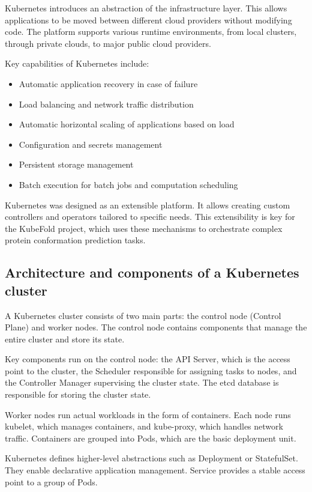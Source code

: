 Kubernetes introduces an abstraction of the infrastructure layer.
This allows applications to be moved between different cloud providers without modifying code.
The platform supports various runtime environments, from local clusters, through private clouds, to major public cloud providers.

Key capabilities of Kubernetes include:
\begin{itemize}
    \item Automatic application recovery in case of failure
    \item Load balancing and network traffic distribution
    \item Automatic horizontal scaling of applications based on load
    \item Configuration and secrets management
    \item Persistent storage management
    \item Batch execution for batch jobs and computation scheduling
\end{itemize}

Kubernetes was designed as an extensible platform.
It allows creating custom controllers and operators tailored to specific needs.
This extensibility is key for the KubeFold project, which uses these mechanisms to orchestrate complex protein conformation prediction tasks.

\subsection{Architecture and components of a Kubernetes cluster}

A Kubernetes cluster consists of two main parts: the control node (Control Plane) and worker nodes.
The control node contains components that manage the entire cluster and store its state.

Key components run on the control node: the API Server, which is the access point to the cluster, the Scheduler responsible for assigning tasks to nodes, and the Controller Manager supervising the cluster state.
The etcd database is responsible for storing the cluster state.

Worker nodes run actual workloads in the form of containers.
Each node runs kubelet, which manages containers, and kube-proxy, which handles network traffic.
Containers are grouped into Pods, which are the basic deployment unit.

Kubernetes defines higher-level abstractions such as Deployment or StatefulSet.
They enable declarative application management. Service provides a stable access point to a group of Pods.

